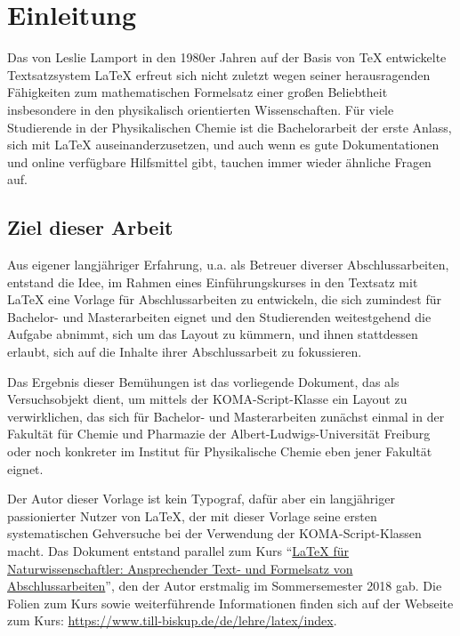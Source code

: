 %
%
%

\chapter{Einleitung}
\label{ch:einleitung}

Das von Leslie Lamport in den 1980er Jahren auf der Basis von \TeX{} \cite{knut-bams-1-337} entwickelte Textsatzsystem \LaTeX{} \cite{kopka-h-2000} erfreut sich nicht zuletzt wegen seiner herausragenden Fähigkeiten zum mathematischen Formelsatz einer großen Beliebtheit insbesondere in den physikalisch orientierten Wissenschaften. Für viele Studierende in der Physikalischen Chemie ist die Bachelorarbeit der erste Anlass, sich mit \LaTeX{} auseinanderzusetzen, und auch wenn es gute Dokumentationen und online verfügbare Hilfsmittel gibt, tauchen immer wieder ähnliche Fragen auf.


\section{Ziel dieser Arbeit}

Aus eigener langjähriger Erfahrung, u.a. als Betreuer diverser Abschlussarbeiten, entstand die Idee, im Rahmen eines Einführungskurses in den Textsatz mit \LaTeX{} eine Vorlage für Abschlussarbeiten zu entwickeln, die sich zumindest für Bachelor- und Masterarbeiten eignet und den Studierenden weitestgehend die Aufgabe abnimmt, sich um das Layout zu kümmern, und ihnen stattdessen erlaubt, sich auf die Inhalte ihrer Abschlussarbeit zu fokussieren.

Das Ergebnis dieser Bemühungen ist das vorliegende Dokument, das als Versuchsobjekt dient, um mittels der KOMA-Script-Klasse  \cite{kohm-m-2014} ein Layout zu verwirklichen, das sich für Bachelor- und Masterarbeiten zunächst einmal in der Fakultät für Chemie und Pharmazie der Albert-Ludwigs-Universität Freiburg oder noch konkreter im Institut für Physikalische Chemie eben jener Fakultät eignet.

Der Autor dieser Vorlage ist kein Typograf, dafür aber ein langjähriger passionierter Nutzer von \LaTeX{}, der mit dieser Vorlage seine ersten systematischen Gehversuche bei der Verwendung der KOMA-Script-Klassen macht. Das Dokument entstand parallel zum Kurs \enquote{\href{https://www.till-biskup.de/de/lehre/latex/index}{\LaTeX{} für Naturwissenschaftler: Ansprechender Text- und Formelsatz von Abschlussarbeiten}}, den der Autor erstmalig im Sommersemester 2018 gab. Die Folien zum Kurs sowie weiterführende Informationen finden sich auf der Webseite zum Kurs: \url{https://www.till-biskup.de/de/lehre/latex/index}.

